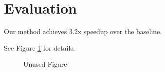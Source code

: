 \section{Evaluation}
\label{sec:eval}

Our method achieves 3.2x speedup over the baseline.

See Figure \ref{fig:unused_eval} for details.

\begin{figure}[htbp]
\centering
\caption{Unused Figure}
\label{fig:unused_eval}
\end{figure}
